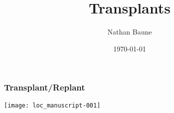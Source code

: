 \documentclass{beamer}
\title[Short title]{Transplants} %
\author{Nathan Baune} %
\institute[UM] %
{
  University of Missouri-Columbia \\ %
  \medskip
  \textit{nabwg6@mail.missouri.edu} %
}
\date{\today} %
\begin{document}



\begin{frame}
\vspace*{-1cm}
\frametitle{Transplant/Replant} %
\texttt{[image: loc\_manuscript-001]}
\end{frame}


  
  
\end{document}
